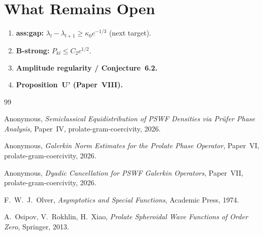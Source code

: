 \documentclass[12pt]{amsart}
\begin{document}
\section{What Remains Open}
\label{sec:open}

\begin{enumerate}[(O1)]
  \item \textbf{ass:gap:}
    $\lambda_l - \lambda_{l+1} \ge \kappa_0 c^{-1/3}$
    (next target).
  \item \textbf{B-strong:}
    $P_{kl} \le C_2 c^{1/2}$.
  \item \textbf{Amplitude regularity / Conjecture~6.2.}
  \item \textbf{Proposition~U' (Paper~VIII).}
\end{enumerate}

\begin{thebibliography}{99}

  Anonymous,
  \textit{Semiclassical Equidistribution of PSWF Densities
  via Pr\"ufer Phase Analysis},
  Paper~IV, prolate-gram-coercivity, 2026.

  Anonymous,
  \textit{Galerkin Norm Estimates for the Prolate Phase Operator},
  Paper~VI, prolate-gram-coercivity, 2026.

  Anonymous,
  \textit{Dyadic Cancellation for PSWF Galerkin Operators},
  Paper~VII, prolate-gram-coercivity, 2026.

  F.~W.~J.~Olver,
  \textit{Asymptotics and Special Functions},
  Academic Press, 1974.

  A.~Osipov, V.~Rokhlin, H.~Xiao,
  \textit{Prolate Spheroidal Wave Functions of Order Zero},
  Springer, 2013.

\end{thebibliography}
\end{document}
